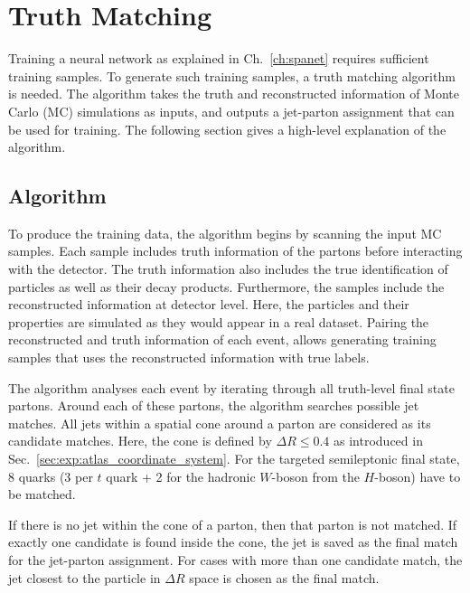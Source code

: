\documentclass[bachelor,ngerman,english]{GAUBM}
\begin{document}

\chapter{Truth Matching}
\label{ch:truth_matching}
Training a neural network as explained in Ch.~\ref{ch:spanet} requires sufficient training samples. To generate such training samples, a truth matching algorithm is needed. The algorithm takes the truth and reconstructed information of Monte Carlo (MC) simulations as inputs, and outputs a jet-parton assignment that can be used for training. The following section gives a high-level explanation of the algorithm.

\section{Algorithm}
\label{sec:truth_matching:algorithm}
To produce the training data, the algorithm begins by scanning the input MC samples. Each sample includes truth information of the partons before interacting with the detector. The truth information also includes the true identification of particles as well as their decay products. Furthermore, the samples include the reconstructed information at detector level. Here, the particles and their properties are simulated as they would appear in a real dataset. Pairing the reconstructed and truth information of each event, allows generating training samples that uses the reconstructed information with true labels. 

The algorithm analyses each event by iterating through all truth-level final state partons. Around each of these partons, the algorithm searches possible jet matches. All jets within a spatial cone around a parton are considered as its candidate matches. Here, the cone is defined by $\Delta R\leq0.4$ as introduced in Sec.~\ref{sec:exp:atlas_coordinate_system}. For the targeted \ttHWW semileptonic final state, 8 quarks (3 per $t$ quark + 2 for the hadronic $W$-boson from the $H$-boson) have to be matched. 

If there is no jet within the cone of a parton, then that parton is not matched. If exactly one candidate is found inside the cone, the jet is saved as the final match for the jet-parton assignment. For cases with more than one candidate match, the jet closest to the particle in $\Delta R$ space is chosen as the final match. 
\end{document}
